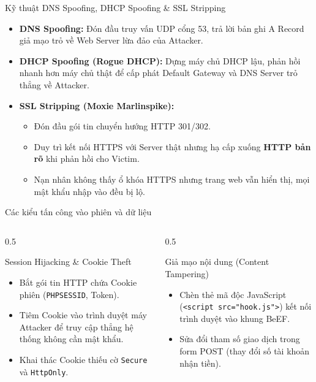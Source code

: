 \documentclass[fleqn]{beamer}
\begin{document}
\begin{frame}{Kỹ thuật DNS Spoofing, DHCP Spoofing \& SSL Stripping}
  \begin{itemize}
    \item \textbf{DNS Spoofing:} Đón đầu truy vấn UDP cổng 53, trả lời bản ghi A Record giả mạo trỏ về Web Server lừa đảo của Attacker.
    \item \textbf{DHCP Spoofing (Rogue DHCP):} Dựng máy chủ DHCP lậu, phản hồi nhanh hơn máy chủ thật để cấp phát Default Gateway và DNS Server trỏ thẳng về Attacker.
    \item \textbf{SSL Stripping (Moxie Marlinspike):}
      \begin{itemize}
        \item Đón đầu gói tin chuyển hướng HTTP 301/302.
        \item Duy trì kết nối HTTPS với Server thật nhưng hạ cấp xuống \textbf{HTTP bản rõ} khi phản hồi cho Victim.
        \item Nạn nhân không thấy ổ khóa HTTPS nhưng trang web vẫn hiển thị, mọi mật khẩu nhập vào đều bị lộ.
      \end{itemize}
  \end{itemize}
\end{frame}

\begin{frame}{Các kiểu tấn công vào phiên và dữ liệu}
  \begin{columns}
    \begin{column}{0.5\textwidth}
      \begin{block}{Session Hijacking \& Cookie Theft}
        \begin{itemize}
          \item Bắt gói tin HTTP chứa Cookie phiên (\texttt{PHPSESSID}, Token).
          \item Tiêm Cookie vào trình duyệt máy Attacker để truy cập thẳng hệ thống không cần mật khẩu.
          \item Khai thác Cookie thiếu cờ \texttt{Secure} và \texttt{HttpOnly}.
        \end{itemize}
      \end{block}
    \end{column}
    \begin{column}{0.5\textwidth}
      \begin{block}{Giả mạo nội dung (Content Tampering)}
        \begin{itemize}
          \item Chèn thẻ mã độc JavaScript (\texttt{<script src="hook.js">}) kết nối trình duyệt vào khung BeEF.
          \item Sửa đổi tham số giao dịch trong form POST (thay đổi số tài khoản nhận tiền).
        \end{itemize}
      \end{block}
    \end{column}
  \end{columns}
\end{frame}
\end{document}
